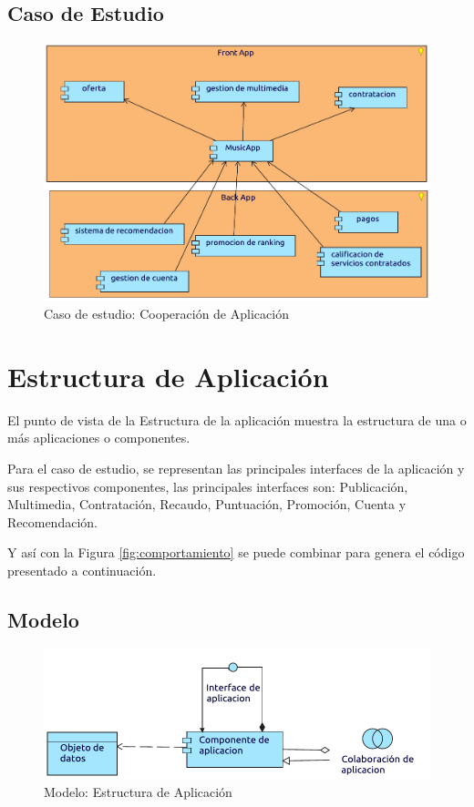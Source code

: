 \subsection{Caso de Estudio}

\begin{figure}[h!]
	\centering
	\includegraphics[width=\linewidth]{Arquitectura/Aplicacion/imgs/Cooperacion.pdf}
	\caption{Caso de estudio: Cooperación de Aplicación }
\end{figure}

\newpage

\section{Estructura de Aplicación}
El punto de vista de la Estructura de la aplicación muestra la estructura de una o más aplicaciones o componentes. \vspace{\baselineskip}

Para el caso de estudio, se representan las principales interfaces de la aplicación y sus respectivos componentes, las principales interfaces son: Publicación, Multimedia, Contratación, Recaudo, Puntuación, Promoción, Cuenta y Recomendación. \vspace{\baselineskip}

Y así con la Figura \ref{fig:comportamiento} se puede combinar para genera el código presentado a continuación.
\subsection{Modelo}
\begin{figure}[h!]
	\centering
	\includegraphics[width=\linewidth]{Arquitectura/Aplicacion/imgs/estructuraMetamodelo.pdf}
	\caption{Modelo: Estructura de Aplicación}
\end{figure}
\newpage

